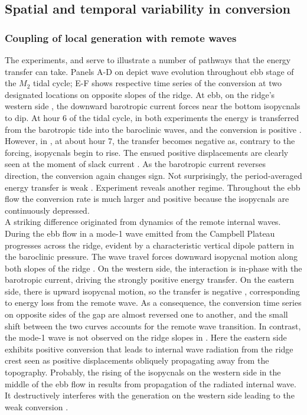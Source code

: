 \documentclass[12pt]{article}
\begin{document}
\newpage
\subsection{Spatial and temporal variability in conversion}
\subsubsection{Coupling of local generation with remote waves}
\label{C3.sec:amp_mech}
The experiments,  and  serve to illustrate a number of pathways that the 
energy transfer can take. Panels A-D on  depict wave evolution throughout ebb 
stage of the $M_2$ tidal cycle; E-F shows respective time 
series of the conversion at two designated locations on opposite slopes of the ridge. At 
ebb, on the ridge's western side , the downward barotropic current 
forces near the bottom isopycnals to dip. At hour 6 of the tidal cycle, in both experiments the 
energy is transferred from the barotropic tide into the baroclinic waves, and the conversion is 
positive . However, in , at about hour 7, the 
transfer becomes negative as, contrary to the forcing, isopycnals begin to rise. The ensued  
positive displacements are clearly seen at the moment of slack current . 
As the 
barotropic current reverses direction, the conversion again changes sign. Not surprisingly, the 
period-averaged energy transfer is weak . Experiment  
reveals another regime. Throughout the ebb flow the conversion rate is much larger and positive 
because the isopycnals are continuously depressed.\\

A striking difference originated from dynamics of the remote internal waves. During the ebb flow 
in  a mode-1 wave emitted from the Campbell Plateau progresses across 
the ridge, evident by a characteristic vertical dipole pattern in the baroclinic pressure. The wave 
travel forces downward isopycnal motion along both slopes of the ridge . 
On the western side, the 
interaction is in-phase with the barotropic current, driving the strongly positive energy 
transfer. On the eastern side, there is upward isopycnal motion, so the transfer is negative 
, corresponding to energy loss from the remote wave. As a consequence, 
the 
conversion time series on opposite sides of the gap  are almost 
reversed one to another, and the small shift between the two curves accounts for the remote wave 
transition.
In contrast, the 
mode-1 wave is not observed on the ridge slopes in . Here the eastern side exhibits 
positive 
conversion that leads to internal wave radiation from the ridge crest  
seen 
as positive displacements obliquely propagating away from the topography. 
Probably, the rising of the isopycnals on the western side  
in the middle of the ebb flow in  results from propagation of the 
radiated internal wave. It destructively interferes with the generation on the western side 
leading to the weak conversion .\\
\end{document}
